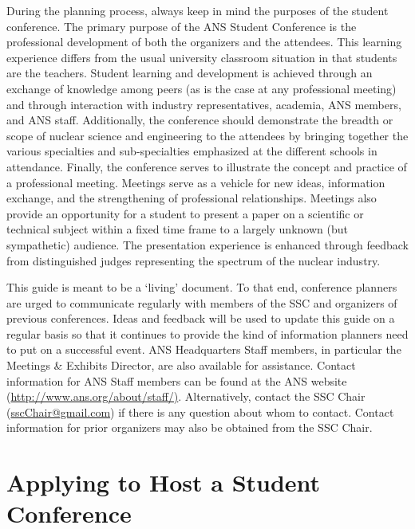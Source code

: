 \documentclass[12pt]{article}
\begin{document}
During the planning process, always keep in mind the purposes of the student conference.
The primary purpose of the ANS Student Conference is the professional development of both the organizers and the attendees.
This learning experience differs from the usual university classroom situation in that students are the teachers.
Student learning and development is achieved through an exchange of knowledge among peers (as is the case at any professional meeting) and through interaction with industry representatives, academia, ANS members, and ANS staff.
Additionally, the conference should demonstrate the breadth or scope of nuclear science and engineering to the attendees by bringing together the various specialties and sub-specialties emphasized at the different schools in attendance.
Finally, the conference serves to illustrate the concept and practice of a professional meeting.
Meetings serve as a vehicle for new ideas, information exchange, and the strengthening of professional relationships.
Meetings also provide an opportunity for a student to present a paper on a scientific or technical subject within a fixed time frame to a largely unknown (but sympathetic) audience.
The presentation experience is enhanced through feedback from distinguished judges representing the spectrum of the nuclear industry.

This guide is meant to be a `living' document.
To that end, conference planners are urged to communicate regularly with members of the SSC and organizers of previous conferences.
Ideas and feedback will be used to update this guide on a regular basis so that it continues to provide the kind of information planners need to put on a successful event.
ANS Headquarters Staff members, in particular the Meetings \& Exhibits Director, are also available for assistance.
Contact information for ANS Staff members can be found at the ANS website (\href{http://www.ans.org/about/staff/}{http://www.ans.org/about/staff/)}.
Alternatively, contact the SSC Chair \mbox{(\href{mailto:sscChair@gmail.com}{sscChair@gmail.com})} if there is any question about whom to contact.
Contact information for prior organizers may also be obtained from the SSC Chair.

\section{Applying to Host a Student Conference}
\end{document}
